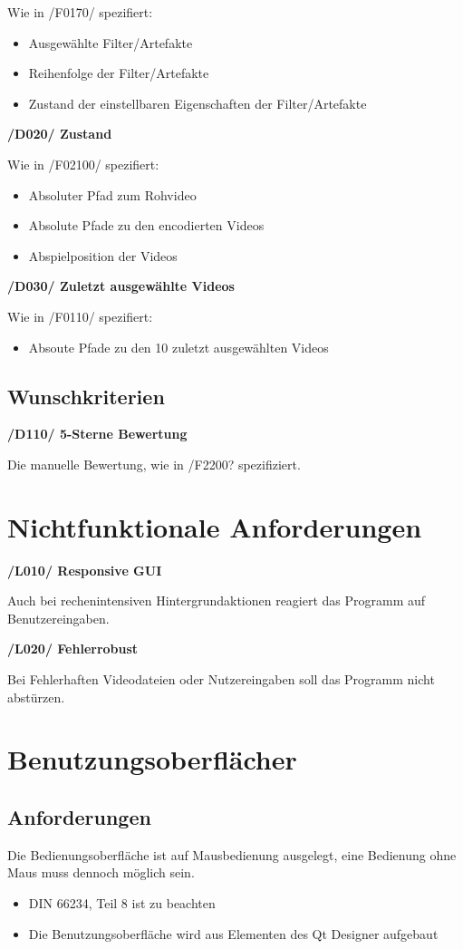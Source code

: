 \documentclass[parskip=full]{scrartcl}
\begin{document}
Wie in /F0170/ spezifiert:
\begin{itemize}
\item Ausgewählte Filter/Artefakte
\item Reihenfolge der Filter/Artefakte
\item Zustand der einstellbaren Eigenschaften der Filter/Artefakte
\end{itemize}

\textbf{/D020/ Zustand}

Wie in /F02100/ spezifiert:
\begin{itemize}
\item Absoluter Pfad zum Rohvideo
\item Absolute Pfade zu den encodierten Videos
\item Abspielposition der Videos
\end{itemize}

\textbf{/D030/ Zuletzt ausgewählte Videos}

Wie in /F0110/ spezifiert:
\begin{itemize}
\item Absoute Pfade zu den 10 zuletzt ausgewählten Videos
\end{itemize}

\subsection{Wunschkriterien}
\textbf{/D110/ 5-Sterne Bewertung}

Die manuelle Bewertung, wie in /F2200? spezifiziert.


\newpage
\section{Nichtfunktionale Anforderungen}
\textbf{/L010/ Responsive GUI}

Auch bei rechenintensiven Hintergrundaktionen reagiert das Programm auf Benutzereingaben.

\textbf{/L020/ Fehlerrobust}

Bei Fehlerhaften Videodateien oder Nutzereingaben soll das Programm nicht abstürzen.
\newpage
\section{Benutzungsoberflächer}
\subsection{Anforderungen}
Die Bedienungsoberfläche ist auf Mausbedienung ausgelegt, eine Bedienung ohne Maus muss dennoch möglich sein.
\begin{itemize}
\item DIN 66234, Teil 8 ist zu beachten
\item Die Benutzungsoberfläche wird aus Elementen des Qt Designer aufgebaut
\end{itemize}
\end{document}
